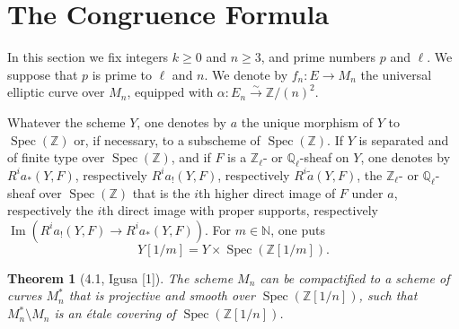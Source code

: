 \documentclass[10pt]{article}
\newcommand{\Q}{\mathbb Q}
\newcommand{\Z}{\mathbb Z}
\newcommand{\Spec}{\operatorname{Spec}}
\newcommand{\Imop}{\operatorname{Im}}
\newtheorem*{theorem}{Theorem}
\begin{document}
\section{The Congruence Formula}

In this section we fix integers $k\geq 0$ and $n\geq 3$, and prime numbers $p$ and $\ell$. We suppose that $p$ is prime to $\ell$ and $n$. We denote by $f_n:E\to M_n$ the universal elliptic curve over $M_n$, equipped with $\alpha:E_n\xrightarrow{\sim}\Z/(n)^2$.

Whatever the scheme $Y$, one denotes by $a$ the unique morphism of $Y$ to $\Spec(\Z)$ or, if necessary, to a subscheme of $\Spec(\Z)$. If $Y$ is separated and of finite type over $\Spec(\Z)$, and if $F$ is a $\Z_\ell$- or $\Q_\ell$-sheaf on $Y$, one denotes by $R^ia_*(Y,F)$, respectively $R^ia_!(Y,F)$, respectively $R^i\widetilde a(Y,F)$, the $\Z_\ell$- or $\Q_\ell$-sheaf over $\Spec(\Z)$ that is the $i$th higher direct image of $F$ under $a$, respectively the $i$th direct image with proper supports, respectively $\Imop(R^ia_!(Y,F)\to R^ia_*(Y,F))$. For $m\in\mathbb N$, one puts
\[
Y[1/m]=Y\times\Spec(\Z[1/m]).
\]

\begin{theorem}[4.1, Igusa {\rm [1]}]
The scheme $M_n$ can be compactified to a scheme of curves $M_n^*$ that is projective and smooth over $\Spec(\Z[1/n])$, such that $M_n^*\setminus M_n$ is an étale covering of $\Spec(\Z[1/n])$.
\end{theorem}
\end{document}
